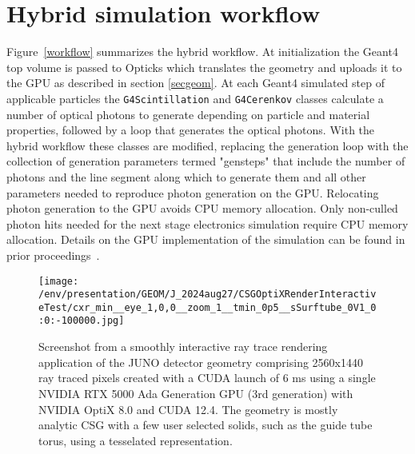 \documentclass{webofc}
\begin{document}
\section{Hybrid simulation workflow}%
\label{secworkflow}%
%
Figure~\ref{workflow} summarizes the hybrid workflow. 
At initialization the Geant4 top volume is passed to Opticks
which translates the geometry and uploads it to the GPU as described in section \ref{secgeom}.
%
At each Geant4 simulated step of applicable particles the {\tt G4Scintillation} and {\tt G4Cerenkov} classes 
calculate a number of optical photons to generate depending on particle and material properties, 
followed by a loop that generates the optical photons. 
With the hybrid workflow these classes are modified, replacing the generation loop with the collection of 
generation parameters termed "gensteps" that include the number of photons and the line segment along which to generate them and all
other parameters needed to reproduce photon generation on the GPU. Relocating photon generation to the
GPU avoids CPU memory allocation. Only non-culled photon hits needed for the next stage electronics 
simulation require CPU memory allocation. Details on the GPU implementation of the simulation 
can be found in prior proceedings~\cite{chep2023}. 
%
%
%
\begin{figure}
\centering
\texttt{[image: /env/presentation/GEOM/J\_2024aug27/CSGOptiXRenderInteractiveTest/cxr\_min\_\_eye\_1,0,0\_\_zoom\_1\_\_tmin\_0p5\_\_sSurftube\_0V1\_0:0:-100000.jpg]}
\caption{Screenshot from a smoothly interactive ray trace rendering application of the JUNO detector geometry comprising 2560x1440 ray traced pixels created with a CUDA launch of 6 ms
using a single NVIDIA RTX 5000 Ada Generation GPU (3rd generation) with NVIDIA OptiX 8.0 and CUDA 12.4.
The geometry is mostly analytic CSG with a few user selected solids, such as the guide tube torus, using a tesselated representation.  
}    
\label{interactive}
\vspace{-5mm}
\end{figure}
%
%
\end{document}

